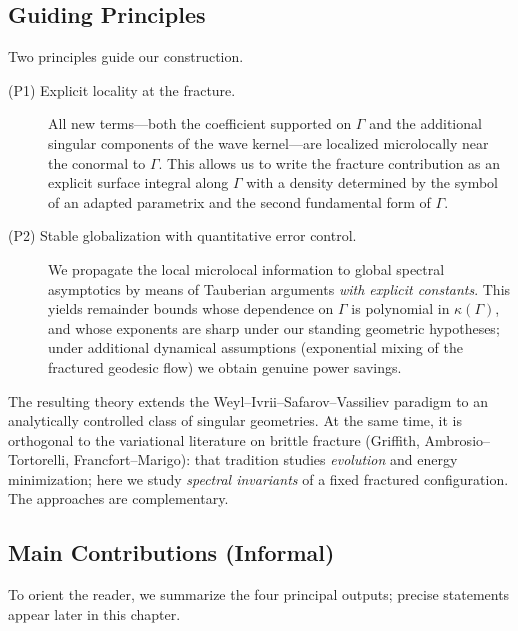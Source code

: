 \subsection*{Guiding Principles}

Two principles guide our construction.

\begin{description}
  \item[(P1) Explicit locality at the fracture.]  
  All new terms—both the coefficient supported on $\Gamma$ and the additional 
  singular components of the wave kernel—are localized microlocally near the 
  conormal to $\Gamma$. This allows us to write the fracture contribution as an 
  explicit surface integral along $\Gamma$ with a density determined by the 
  symbol of an adapted parametrix and the second fundamental form of $\Gamma$.

  \item[(P2) Stable globalization with quantitative error control.]  
  We propagate the local microlocal information to global spectral asymptotics 
  by means of Tauberian arguments \emph{with explicit constants}. This yields 
  remainder bounds whose dependence on $\Gamma$ is polynomial in 
  $\kappa(\Gamma)$, and whose exponents are sharp under our standing geometric 
  hypotheses; under additional dynamical assumptions (exponential mixing of the 
  fractured geodesic flow) we obtain genuine power savings.
\end{description}

The resulting theory extends the Weyl–Ivrii–Safarov–Vassiliev paradigm to an 
analytically controlled class of singular geometries. At the same time, it is 
orthogonal to the variational literature on brittle fracture (Griffith, 
Ambrosio–Tortorelli, Francfort–Marigo): that tradition studies \emph{evolution} 
and energy minimization; here we study \emph{spectral invariants} of a fixed 
fractured configuration. The approaches are complementary.

\subsection*{Main Contributions (Informal)}

To orient the reader, we summarize the four principal outputs; precise 
statements appear later in this chapter.

